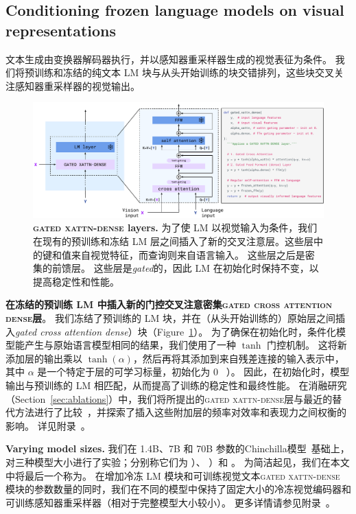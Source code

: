 \subsection{Conditioning frozen language models on visual representations}
\label{sec:xattn_dense}


文本生成由变换器解码器执行，并以感知器重采样器生成的视觉表征为条件。
我们将预训练和冻结的纯文本 LM 块与从头开始训练的块交错排列，这些块交叉关注感知器重采样器的视觉输出。


\begin{figure}[t]
\includegraphics[width=\linewidth]{figures/fig4_xattn_dense.pdf}
\centering
\caption{\capfontsize{} \textbf{\textsc{gated xattn-dense} layers.} 为了使 LM 以视觉输入为条件，我们在现有的预训练和冻结 LM 层之间插入了新的交叉注意层。这些层中的键和值来自视觉特征，而查询则来自语言输入。
这些层之后是密集的前馈层。
这些层是\emph{gated}的，因此 LM 在初始化时保持不变，以提高稳定性和性能。}
\label{fig:xattn_dense}
\end{figure}

\textbf{在冻结的预训练 LM 中插入新的\textsc{门控交叉注意密集gated cross attention dense}层}。
我们冻结了预训练的 LM 块，并在（从头开始训练的）原始层之间插入\textit{gated cross attention dense}）块（Figure~\ref{fig:xattn_dense}）。
为了确保在初始化时，条件化模型能产生与原始语言模型相同的结果，我们使用了一种 $\tanh$ 门控机制。
这将新添加层的输出乘以 $\tanh(\alpha)$，然后再将其添加到来自残差连接的输入表示中，其中 $\alpha$ 是一个特定于层的可学习标量，初始化为 $0$ ~\cite{bachlechner2021rezero}）。
因此，在初始化时，模型输出与预训练的 LM 相匹配，从而提高了训练的稳定性和最终性能。
在消融研究（Section~\ref{sec:ablations}）中，我们将所提出的\textsc{gated xattn-dense}层与最近的替代方法进行了比较~\citep{desai2021virtex,luo2022vc}，并探索了插入这些附加层的频率对效率和表现力之间权衡的影响。
详见附录~。


\textbf{Varying model sizes.}
我们在 1.4B、7B 和 70B 参数的Chinchilla模型~\citep{chinchilla}基础上，对三种模型大小进行了实验；分别称它们为 \base{}）、 \medium{}）和 \largemfull{}。
为简洁起见，我们在本文中将最后一个称为\largem{}。
在增加冷冻 LM 模块和可训练视觉文本\textsc{gated xattn-dense} 模块的参数数量的同时，我们在不同的模型中保持了固定大小的冷冻视觉编码器和可训练感知器重采样器（相对于完整模型大小较小）。
更多详情请参见附录~。



